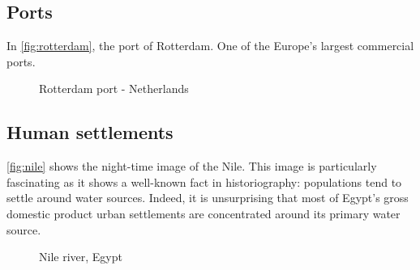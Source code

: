 \subsection{Ports}
 In \autoref{fig:rotterdam}, the port of Rotterdam. One of the Europe's largest commercial ports. 
\begin{figure}[h!]
    \centering
    \qquad
    \caption{Rotterdam port - Netherlands}%
    \label{fig:rotterdam}
\end{figure}
\subsection{Human settlements}
 \autoref{fig:nile} shows the night-time image of the Nile. This image is particularly fascinating as it shows a well-known fact in historiography: populations tend to settle around water sources. Indeed, it is unsurprising that most of Egypt's gross domestic product urban settlements are concentrated around its primary water source.
\begin{figure}[h!]
    \centering
    \qquad
    \caption{Nile river, Egypt}%
    \label{fig:nile}
\end{figure}


